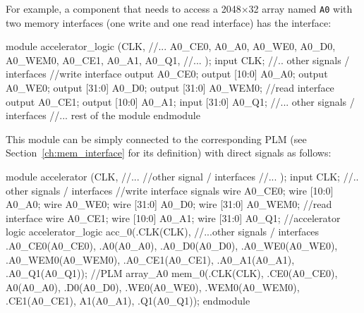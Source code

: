 For example, a component  that needs to access
a 2048$\times$32 array named {\tt A0} with two memory interfaces (one
write and one read interface) has the interface:

\begin{myverilog}{}
module accelerator_logic (CLK,
              //...
              A0_CE0, A0_A0, A0_WE0, A0_D0, A0_WEM0,
              A0_CE1, A0_A1, A0_Q1,
              //...
              );
  input         CLK;
  //.. other signals / interfaces
  //write interface
  output        A0_CE0;
  output [10:0] A0_A0;
  output        A0_WE0;
  output [31:0] A0_D0;
  output [31:0] A0_WEM0;
  //read interface
  output        A0_CE1;
  output [10:0] A0_A1;
  input  [31:0] A0_Q1;
  //... other signals / interfaces
  //... rest of the module
endmodule 
\end{myverilog}


\noindent This module can be simply connected to the corresponding PLM 
(see Section~\ref{ch:mem_interface} for its definition) with direct
signals as follows:

\begin{myverilog}{}
module accelerator (CLK,
              //...
              //other signal / interfaces
              //...
              );
  input         CLK;
  //.. other signals / interfaces
  //write interface signals
  wire        A0_CE0;
  wire [10:0] A0_A0;
  wire        A0_WE0;
  wire [31:0] A0_D0;
  wire [31:0] A0_WEM0;
  //read interface
  wire        A0_CE1;
  wire [10:0] A0_A1;
  wire [31:0] A0_Q1;
  //accelerator logic
  accelerator_logic acc_0(.CLK(CLK), 
      //...other signals / interfaces 
      .A0_CE0(A0_CE0), .A0(A0_A0),
      .A0_D0(A0_D0), .A0_WE0(A0_WE0), .A0_WEM0(A0_WEM0), 
      .A0_CE1(A0_CE1), .A0_A1(A0_A1), .A0_Q1(A0_Q1));     
  //PLM
  array_A0 mem_0(.CLK(CLK),
      .CE0(A0_CE0), A0(A0_A0), 
      .D0(A0_D0), .WE0(A0_WE0), .WEM0(A0_WEM0),
      .CE1(A0_CE1), A1(A0_A1), .Q1(A0_Q1));
endmodule 
\end{myverilog}
